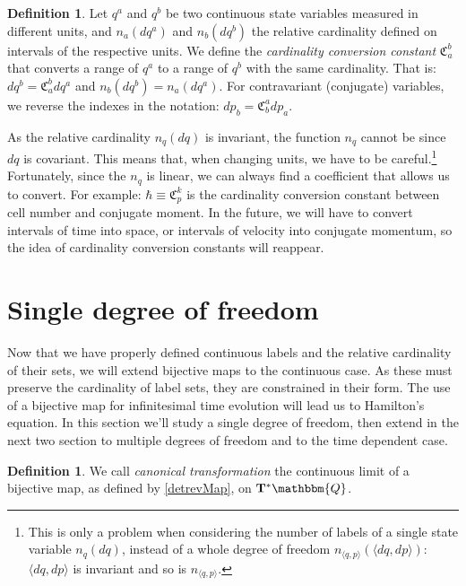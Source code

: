 \documentclass[aps,pra,10pt,twocolumn,floatfix,nofootinbib]{revtex4-1}
\theoremstyle{definition}
\newtheorem{defn}[thm]{Definition}
\begin{document}
\begin{defn}\label{cardinalityConversionConstant}
Let $q^a$ and $q^b$ be two continuous state variables measured in different units, and $n_a(dq^a)$ and $n_b(dq^b)$ the relative cardinality defined on intervals of the respective units. We define the \emph{cardinality conversion constant} $\mathfrak{C}^b_a$ that converts a range of $q^a$ to a range of $q^b$ with the same cardinality. That is: $dq^b = \mathfrak{C}^b_a dq^a$ and $n_b(dq^b)=n_a(dq^a)$. For contravariant (conjugate) variables, we reverse the indexes in the notation: $dp_b = \mathfrak{C}^a_b dp_a$.
\end{defn}

As the relative cardinality $n_q(dq)$ is invariant, the function $n_q$ cannot be since $dq$ is covariant. This means that, when changing units, we have to be careful.\footnote{This is only a problem when considering the number of labels of a single state variable $n_q(dq)$, instead of a whole degree of freedom $n_{\langle q, p \rangle}(\langle dq, dp \rangle)$: $\langle dq, dp \rangle$ is invariant and so is $n_{\langle q, p \rangle}$.}
Fortunately, since the $n_q$ is linear, we can always find a coefficient that allows us to convert. For example: $\hbar \equiv \mathfrak{C}^k_p$ is the cardinality conversion constant between cell number and conjugate moment. In the future, we will have to convert intervals of time into space, or intervals of velocity into conjugate momentum, so the idea of cardinality conversion constants will reappear.

\section{Single degree of freedom}

Now that we have properly defined continuous labels and the relative cardinality of their sets, we will extend bijective maps to the continuous case. As these must preserve the cardinality of label sets, they are constrained in their form. The use of a bijective map for infinitesimal time evolution will lead us to Hamilton's equation. In this section we'll study a single degree of freedom, then extend in the next two section to multiple degrees of freedom and to the time dependent case.

\begin{defn}\label{canonical}
We call \emph{canonical transformation} the continuous limit of a bijective map, as defined by \ref{detrevMap}, on $\mathbf{T}^*\mathbbm{Q}$.
\end{defn}
\end{document}
